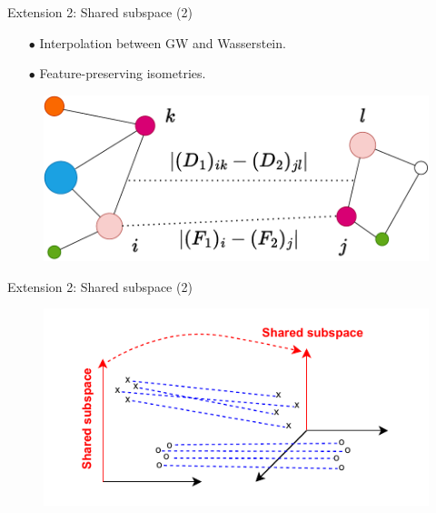 \documentclass{beamer}
\begin{document}
\begin{frame}{Extension 2: Shared subspace (2)}
  \vspace{-0.3cm}
  \begin{minipage}[t]{0.6\linewidth}
    \begin{itemize}
      \item[$\bullet$] Interpolation between GW and Wasserstein.
      \item[$\bullet$] Feature-preserving isometries.
    \end{itemize}
    \end{minipage}%
    \hfill%
    \hspace{-6cm}
    \begin{minipage}[t]{0.45\linewidth}
      \vspace{-0.cm}
    \begin{figure}
      \centering
      \includegraphics[width=1.1\linewidth, keepaspectratio=true]{OT_new/fgw.pdf}
    \end{figure}
    \end{minipage}

\end{frame}

\begin{frame}{Extension 2: Shared subspace (2)}
  \begin{figure}
    \centering
    \includegraphics[width=\linewidth, keepaspectratio=true]{OT_new/coot_motiv.pdf}
  \end{figure}
\end{frame}
\end{document}
